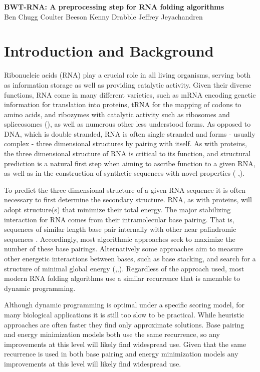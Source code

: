 \documentclass[11pt]{article}
\begin{document}
\begin{center}
\Large\textbf{BWT-RNA: A preprocessing step for RNA folding algorithms}\\
\vspace*{0.8cm}
\large 
Ben Chugg \qquad
Coulter Beeson \qquad
Kenny Drabble \qquad
Jeffrey Jeyachandren 
\end{center}
\vspace*{0.5cm}
\section{Introduction and Background}

Ribonucleic acids (RNA) play a crucial role in all living organisms, serving both as information storage as well as providing catalytic activity. Given their diverse functions, RNA come in many different varieties, such as mRNA encoding genetic information for translation into proteins, tRNA for the mapping of codons to amino acids, and ribozymes with catalytic activity such as ribosomes and spliceosomes (\cite{eight}\cite{nine}\cite{ten}), as well as numerous other less understood forms. As opposed to DNA, which is double stranded, RNA is often single stranded and forms - usually complex -  three dimensional structures by pairing with itself. As with proteins, the three dimensional structure of RNA is critical to its function, and structural prediction is a natural first step when aiming to ascribe function to a given RNA, as well as in the construction of synthetic sequences with novel properties ( \cite{one},\cite{two}). 

To predict the three dimensional structure of a given RNA sequence it is often necessary to first determine the secondary structure. RNA, as with proteins, will adopt structure(s) that minimize their total energy. The major stabilizing interaction for RNA comes from their intramolecular base pairing. That is, sequences of similar length base pair internally with other near palindromic sequences \cite{three}. Accordingly, most algorithmic approaches seek to maximize the number of these base pairings. Alternatively some approaches aim to measure other energetic interactions between bases, such as base stacking, and search for a structure of minimal global energy (\cite{four},\cite{five},\cite{eight}). Regardless of the approach used, most modern RNA folding algorithms use a similar recurrence that is amenable to dynamic programming. 

Although dynamic programming is optimal under a specific scoring model, for many biological applications it is still too slow to be practical. While heuristic approaches are often faster they find only approximate solutions. Base pairing and energy minimization models both use the same recurrence, so any improvements at this level will likely find widespread use. 
 Given that the same recurrence is used in both base pairing and energy minimization models any improvements at this level will likely find widespread use.
\end{document}
